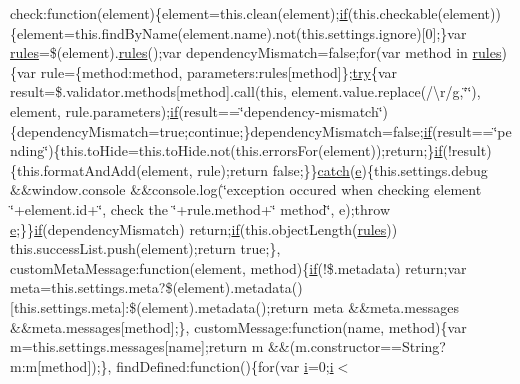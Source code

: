 \begin{DoxyCompactItemize}
check\+:function(element)\{element=this.\+clean(element);\hyperlink{_scripts_2respond_8min_8js_a93851d60dd037a83509a1757b9ee7b66}{if}(this.\+checkable(element))\{element=this.\+find\+By\+Name(element.\+name).not(this.\+settings.\+ignore)\mbox{[}0\mbox{]};\}var \hyperlink{_scripts_2respond_8js_ada87c2e257bc5ff6e77cdbc23ed986a3}{rules}=\$(element).\hyperlink{_scripts_2respond_8js_ada87c2e257bc5ff6e77cdbc23ed986a3}{rules}();var dependency\+Mismatch=false;for(var method in \hyperlink{_scripts_2respond_8js_ada87c2e257bc5ff6e77cdbc23ed986a3}{rules})\{var rule=\{method\+:method, parameters\+:rules\mbox{[}method\mbox{]}\};\hyperlink{_scripts_2jquery-1_810_82_8js_abe4cc9788f52e49485473dc699537388}{try}\{var result=\$.validator.\+methods\mbox{[}method\mbox{]}.call(this, element.\+value.\+replace(/\textbackslash{}r/\hyperlink{jquery_8unobtrusive-ajax_8min_8js_abdf64181dd0fecc8ac45c3cfa81562b1}{g},\char`\"{}\char`\"{}), element, rule.\+parameters);\hyperlink{_scripts_2respond_8min_8js_a93851d60dd037a83509a1757b9ee7b66}{if}(result==\char`\"{}dependency-\/mismatch\char`\"{})\{dependency\+Mismatch=true;continue;\}dependency\+Mismatch=false;\hyperlink{_scripts_2respond_8min_8js_a93851d60dd037a83509a1757b9ee7b66}{if}(result==\char`\"{}pending\char`\"{})\{this.\+to\+Hide=this.\+to\+Hide.\+not(this.\+errors\+For(element));return;\}\hyperlink{_scripts_2respond_8min_8js_a93851d60dd037a83509a1757b9ee7b66}{if}(!result)\{this.\+format\+And\+Add(element, rule);return false;\}\}\hyperlink{_scripts_2jquery-1_810_82_8js_a5bf45fc51bc0426586792b5f9cb95431}{catch}(\hyperlink{jquery_8unobtrusive-ajax_8min_8js_a1bbdb559c9d41205c42f84b233650eb3}{e})\{this.\+settings.\+debug \&\&window.\+console \&\&console.\+log(\char`\"{}exception occured when checking element \char`\"{}+element.\+id+\char`\"{}, check the \textquotesingle{}\char`\"{}+rule.\+method+\char`\"{}\textquotesingle{} method\char`\"{}, e);throw \hyperlink{jquery_8unobtrusive-ajax_8min_8js_a1bbdb559c9d41205c42f84b233650eb3}{e};\}\}\hyperlink{_scripts_2respond_8min_8js_a93851d60dd037a83509a1757b9ee7b66}{if}(dependency\+Mismatch) return;\hyperlink{_scripts_2respond_8min_8js_a93851d60dd037a83509a1757b9ee7b66}{if}(this.\+object\+Length(\hyperlink{_scripts_2respond_8js_ada87c2e257bc5ff6e77cdbc23ed986a3}{rules})) this.\+success\+List.\+push(element);return true;\}, custom\+Meta\+Message\+:function(element, method)\{\hyperlink{_scripts_2respond_8min_8js_a93851d60dd037a83509a1757b9ee7b66}{if}(!\$.metadata) return;var meta=this.\+settings.\+meta?\$(element).metadata()\mbox{[}this.\+settings.\+meta\mbox{]}\+:\$(element).metadata();return meta \&\&meta.\+messages \&\&meta.\+messages\mbox{[}method\mbox{]};\}, custom\+Message\+:function(name, method)\{var m=this.\+settings.\+messages\mbox{[}name\mbox{]};return m \&\&(m.\+constructor==String?m\+:m\mbox{[}method\mbox{]});\}, find\+Defined\+:function()\{for(var \hyperlink{jquery_8unobtrusive-ajax_8min_8js_a84da5ff1aa6008a770fb28040f6b0569}{i}=0;\hyperlink{jquery_8unobtrusive-ajax_8min_8js_a84da5ff1aa6008a770fb28040f6b0569}{i}$<$ 
\end{DoxyCompactItemize}
